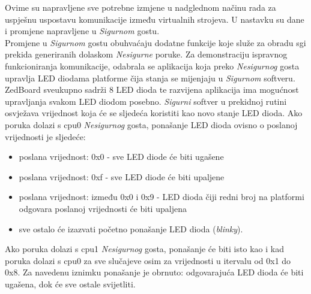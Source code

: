 \documentclass[times, utf8, diplomski, numeric]{fer}
\begin{document}
Ovime su napravljene sve potrebne izmjene u nadglednom načinu rada za uspješnu uspostavu komunikacije između virtualnih
strojeva. U nastavku su dane i promjene napravljene u \textit{Sigurnom} gostu.\\
Promjene u \textit{Sigurnom} gostu
obuhvaćaju dodatne funkcije koje služe za obradu \gls{sgi} prekida generiranih dolaskom \textit{Nesigurne} poruke. Za
demonstraciju ispravnog funkcioniranja komunikacije, odabrala se aplikacija koja preko \textit{Nesigurnog} gosta upravlja
LED diodama platforme čija stanja se mijenjaju u \textit{Sigurnom} softveru. ZedBoard sveukupno sadrži 8 LED dioda te
razvijena aplikacija ima mogućnost upravljanja svakom LED diodom posebno. \textit{Sigurni} softver u prekidnoj rutini
osvježava vrijednost koja će se sljedeća koristiti kao novo stanje LED dioda. Ako poruka dolazi s \gls{cpu}0 \textit{Nesigurnog}
gosta, ponašanje LED dioda ovisno o poslanoj vrijednosti je sljedeće:
\begin{itemize}
  \item{poslana vrijednost: 0x0 - sve LED diode će biti ugašene}
  \item{poslana vrijednost: 0xf - sve LED diode će biti upaljene}
  \item{poslana vrijednost: između 0x0 i 0x9 - LED dioda čiji redni broj na platformi odgovara poslanoj vrijednosti će biti
  upaljena}
  \item{sve ostalo će izazvati početno ponašanje LED dioda (\textit{blinky}).}
\end{itemize}
Ako poruka dolazi s \gls{cpu}1 \textit{Nesigurnog} gosta, ponašanje će biti isto kao i kad poruka dolazi s \gls{cpu}0 za sve slučajeve
osim za vrijednosti u itervalu od 0x1 do 0x8. Za navedenu iznimku ponašanje je obrnuto: odgovarajuća LED dioda će biti
ugašena, dok će sve ostale svijetliti.
\end{document}
